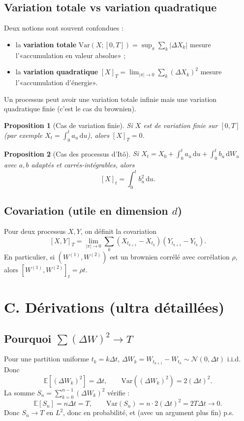 \documentclass[11pt,a4paper]{report}
\theoremstyle{definition}
\theoremstyle{plain}
\newtheorem{proposition}{Proposition}[chapter]
\theoremstyle{remark}
\newcommand{\dd}{\mathrm{d}}
\newcommand{\E}{\mathbb{E}}
\newcommand{\Var}{\mathrm{Var}}
\newcommand{\1}{\mathbf{1}}
\newcommand{\Normal}{\mathcal{N}}
\begin{document}
\subsection*{Variation totale vs variation quadratique}
Deux notions sont souvent confondues :
\begin{itemize}[leftmargin=*]
\item la \textbf{variation totale} $\mathrm{Var}(X;[0,T])=\sup_\pi \sum_k |\Delta X_k|$ mesure l'«accumulation en valeur absolue» ;
\item la \textbf{variation quadratique} $[X]_T=\lim_{|\pi|\to 0}\sum_k (\Delta X_k)^2$ mesure l'«accumulation d'énergie».
\end{itemize}
Un processus peut avoir une variation totale infinie mais une variation quadratique finie (c'est le cas du brownien).

\begin{proposition}[Cas de variation finie]
Si $X$ est de variation finie sur $[0,T]$ (par exemple $X_t=\int_0^t a_u\,\dd u$), alors $[X]_T=0$.
\end{proposition}

\begin{proposition}[Cas des processus d'Itô]
Si $X_t=X_0+\int_0^t a_u\,\dd u + \int_0^t b_u\,\dd W_u$ avec $a,b$ adaptés et carrés-intégrables, alors
\[
[X]_t=\int_0^t b_u^2\,\dd u.
\]
\end{proposition}

\subsection*{Covariation (utile en dimension $d$)}
Pour deux processus $X,Y$, on définit la covariation
\[
[X,Y]_T=\lim_{|\pi|\to 0}\sum_k (X_{t_{k+1}}-X_{t_k})(Y_{t_{k+1}}-Y_{t_k}).
\]
En particulier, si $(W^{(1)},W^{(2)})$ est un brownien corrélé avec corrélation $\rho$, alors $[W^{(1)},W^{(2)}]_t=\rho t$.



\section{C. Dérivations (ultra détaillées)}
\subsection*{Pourquoi $\sum (\Delta W)^2 \to T$}
Pour une partition uniforme $t_k=k\Delta t$, $\Delta W_k=W_{t_{k+1}}-W_{t_k}\sim\Normal(0,\Delta t)$ i.i.d. Donc
\[
\E[(\Delta W_k)^2]=\Delta t,\qquad \Var((\Delta W_k)^2)=2(\Delta t)^2.
\]
La somme $S_n=\sum_{k=0}^{n-1}(\Delta W_k)^2$ vérifie :
\[
\E[S_n]=n\Delta t=T,\qquad \Var(S_n)=n\cdot 2(\Delta t)^2=2T\Delta t\to 0.
\]
Donc $S_n\to T$ en $L^2$, donc en probabilité, et (avec un argument plus fin) p.s.
\end{document}

